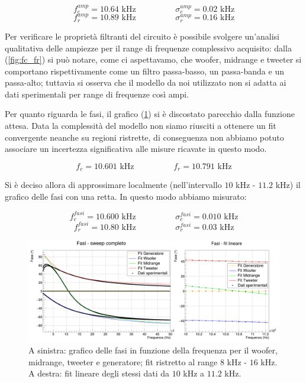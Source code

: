\documentclass[12pt,italian]{article}
\begin{document}
\begin{equation*}
	f_{c}^{amp} = 10.64 \text{ kHz} \hspace{2cm} \sigma_c^{amp} = 0.02 \text{ kHz}
\end{equation*}
\begin{equation*}
	f_{r}^{amp} = 10.89 \text{ kHz} \hspace{2cm} \sigma_r^{amp} = 0.16 \text{ kHz}
\end{equation*}

Per verificare le proprietà filtranti del circuito è possibile svolgere
un'analisi qualitativa delle ampiezze per il range di frequenze complessivo
acquisito: dalla (\cref{fig:fc_fr}) si può notare, come ci aspettavamo, che
woofer, midrange e tweeter si comportano rispettivamente come un filtro
passa-basso, un passa-banda e un passa-alto; tuttavia si osserva che il modello
da noi utilizzato non si adatta ai dati sperimentali per range di frequenze
così ampi.

Per quanto riguarda le fasi, il grafico (\cref{fig:phase_sweep}) si è
discostato parecchio dalla funzione attesa. Data la complessità del modello non
siamo riusciti a ottenere un fit convergente neanche su regioni ristrette, di
conseguenza non abbiamo potuto associare un incertezza significativa alle
misure ricavate in questo modo.

\begin{equation*}
	f_{c} = 10.601 \text{ kHz} \hspace{2cm} f_{r} = 10.791 \text{ kHz}
\end{equation*}

Si è deciso allora di approssimare localmente (nell'intervallo $10$ kHz -
$11.2$ kHz) il grafico delle fasi con una retta. In questo modo abbiamo
misurato:

\begin{equation*}
	f_{c}^{fasi} = 10.600 \text{ kHz}  \hspace{2cm}  \sigma_c^{fasi} = 0.010 \text{ kHz}
\end{equation*}
\begin{equation*}
	f_{r}^{fasi} = 10.80 \text{ kHz}  \hspace{2cm}  \sigma_r^{fasi} = 0.03 \text{ kHz}
\end{equation*}

\begin{figure}[h]
	\centering
	\includegraphics[width=\textwidth]{fig_fase.png}
	\caption{A sinistra: grafico delle fasi in funzione della frequenza per il woofer, midrange, tweeter e generatore;
		fit ristretto al range $8$ kHz - $16$ kHz. A destra: fit lineare degli stessi dati da $10$ kHz a $11.2$ kHz.}\label{fig:phase_sweep}
\end{figure}
\end{document}
